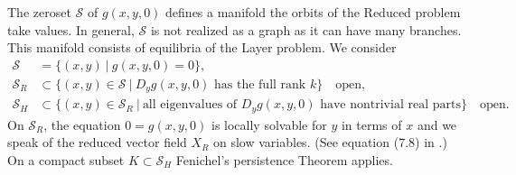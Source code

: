 \documentclass[11pt]{article}
\newcommand{\tcr}{}
\theoremstyle{remark}
\begin{document}
The zeroset $\mathcal{S}$ of $g(x,y,0)$ defines a manifold the orbits of the Reduced problem take values. In general, $\mathcal{S}$ is not realized as a graph as it can have many branches. This manifold consists of equilibria of the Layer problem. We consider
\begin{align*}
 \mathcal{S}& = \Big\{ (x,y)\:\Big|\: g(x,y,0)=0\Big\},\\
 \mathcal{S}_R&\subset \Big\{ (x,y)\in \mathcal{S} \:\Big|\: \text{$D_y g(x,y,0)$ has the full rank $k$}\Big\} \quad \text{open},\\
 \mathcal{S}_H&\subset \Big\{ (x,y)\in \mathcal{S}_R \:\Big|\: \text{all eigenvalues of $D_y g(x,y,0)$ have nontrivial real parts}\Big\}\quad \text{open}.
\end{align*}
On $\mathcal{S}_R$, the equation $0=g(x,y,0)$ is locally solvable for $y$ in terms of $x$ and we speak of the reduced vector field $X_R$ on slow variables. (See equation (7.8) in \cite{fenichel_geometric_1979}.) On a compact subset $K \subset \mathcal{S}_H$ Fenichel's persistence Theorem \cite[Theorem 9.1]{fenichel_geometric_1979} applies. 






\end{document}
